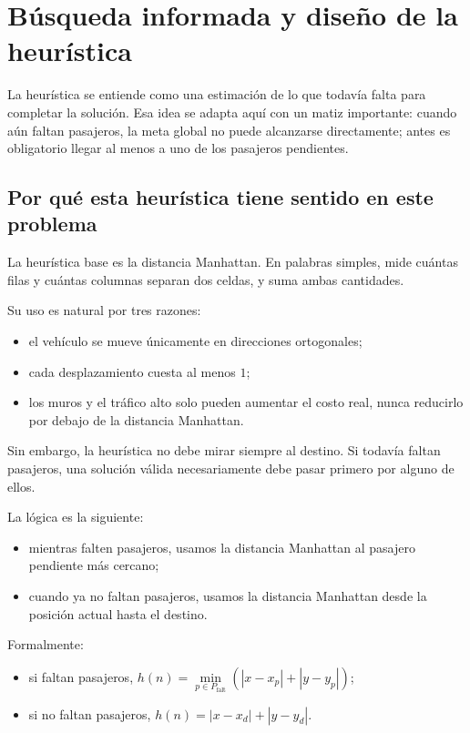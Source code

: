 \documentclass[12pt,a4paper]{article}
\begin{document}
\section{Búsqueda informada y diseño de la heurística}
La heurística se entiende como una estimación de lo que todavía falta para completar la solución. Esa idea se adapta aquí con un matiz importante: cuando aún faltan pasajeros, la meta global no puede alcanzarse directamente; antes es obligatorio llegar al menos a uno de los pasajeros pendientes.

\subsection{Por qué esta heurística tiene sentido en este problema}
La heurística base  es la distancia Manhattan. En palabras simples, mide cuántas filas y cuántas columnas separan dos celdas, y suma ambas cantidades.

Su uso es natural por tres razones:
\begin{itemize}
    \item el vehículo se mueve únicamente en direcciones ortogonales;
    \item cada desplazamiento cuesta al menos \(1\);
    \item los muros y el tráfico alto solo pueden aumentar el costo real, nunca reducirlo por debajo de la distancia Manhattan.
\end{itemize}

Sin embargo, la heurística no debe mirar siempre al destino. Si todavía faltan pasajeros, una solución válida necesariamente debe pasar primero por alguno de ellos.

La lógica es la siguiente:
\begin{itemize}
    \item mientras falten pasajeros, usamos la distancia Manhattan al pasajero pendiente más cercano;
    \item cuando ya no faltan pasajeros, usamos la distancia Manhattan desde la posición actual hasta el destino.
\end{itemize}

Formalmente:
\begin{itemize}
    \item si faltan pasajeros, \(h(n)=\min\limits_{p\in P_{\text{falt}}}\left(|x-x_p|+|y-y_p|\right)\);
    \item si no faltan pasajeros, \(h(n)=|x-x_d|+|y-y_d|\).
\end{itemize}
\end{document}

